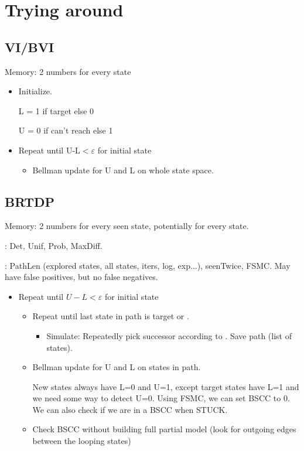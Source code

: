 \section{Trying around}

\subsection{VI/BVI}

Memory: 2 numbers for every state

\begin{itemize}
	\item Initialize.
	
	L = 1 if target else 0
	
	U = 0 if can't reach else 1
	\item Repeat until U-L$<\varepsilon$ for initial state
	\begin{itemize}
		\item Bellman update for U and L on whole state space.
	\end{itemize}
\end{itemize}

\subsection{BRTDP}

Memory: 2 numbers for every seen state, potentially for every state.

\nextstate: Det, Unif, Prob, MaxDiff.

\stuck: PathLen (explored states, all states, iters, log, exp...), seenTwice, FSMC.
May have false positives, but no false negatives.

\begin{itemize}
	\item Repeat until $U-L<\varepsilon$ for initial state
	\begin{itemize}
		\item Repeat until last state in path is target or \stuck.
		\begin{itemize}
		\item Simulate: Repeatedly pick successor according to \nextstate. Save path (list of states).
		\end{itemize}
	\item Bellman update for U and L on states in path. 
	
	New states always have L=0 and U=1, except target states have L=1 and we need some way to detect U=0. Using FSMC, we can set BSCC to 0. We can also check if we are in a BSCC when STUCK.
	
	\item Check BSCC without building full partial model (look for outgoing edges between the looping states)
	\end{itemize}
\end{itemize}

